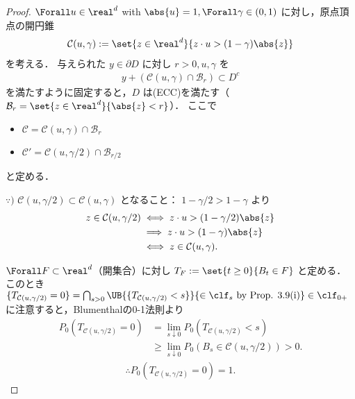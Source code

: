 \documentclass{jsarticle}
\begin{document}
\begin{proof}
    $\Forall u\in\real^d$ with $\abs{u}=1, \Forall \gamma\in(0, 1)$ に対し，原点頂点の開円錐
    \begin{align}
        \mathcal{C}(u, \gamma)
        := \set{z\in\real^d}{z\cdot u>(1-\gamma)\abs{z}}
    \end{align}
    を考える．
    与えられた $y\in\partial D$ に対し $r>0, u, \gamma$ を
    \begin{align}
        y+(\mathcal{C}(u, \gamma)\cap\mathcal{B}_{r})\subset D^c
    \end{align}
    を満たすように固定すると，$D$ は(ECC)を満たす（$\mathcal{B}_{r}=\set{z\in\real^d}{\abs{z}<r}$）．
    ここで
    \begin{itemize}
        \item $\mathcal{C}=\mathcal{C}(u, \gamma)\cap\mathcal{B}_{r}$
        \item $\mathcal{C}'=\mathcal{C}(u, \gamma/2)\cap\mathcal{B}_{r/2}$
    \end{itemize}
    と定める．
    
    \begin{screen}
        $\because)$
        $\mathcal{C}(u, \gamma/2)\subset \mathcal{C}(u, \gamma)$ となること：
        $1-\gamma/2>1-\gamma$ より
        \begin{align}
            z\in\mathcal{C}(u, \gamma/2)
            &\iff z\cdot u>(1-\gamma/2)\abs{z} \\
            &\implies z\cdot u>(1-\gamma)\abs{z} \\
            &\iff z\in\mathcal{C}(u, \gamma).
        \end{align}
    \end{screen}

    $\Forall F\subset \real^d$（開集合）に対し $T_F:=\set{t\ge0}{B_t\in F}$ と定める．
    このとき $\{T_{\mathcal{C}(u, \gamma/2)}=0\}=\bigcap_{s>0}\UB{\{T_{\mathcal{C}(u, \gamma/2)}<s\}}{\in\clf_s\text{ by Prop. 3.9(i)}}\in\clf_{0+}$ に注意すると，Blumenthalの0-1法則より
    \begin{align}
        P_0(T_{\mathcal{C}(u, \gamma/2)}=0)
        &= \lim_{s\downarrow0}P_0(T_{\mathcal{C}(u, \gamma/2)}<s) \\
        &\ge \lim_{s\downarrow0}P_0(B_s\in\mathcal{C}(u, \gamma/2)) > 0.
    \end{align}
    \begin{gather}
        \therefore 
        P_0(T_{\mathcal{C}(u, \gamma/2)}=0) = 1.
    \end{gather}


\end{proof}
\end{document}
